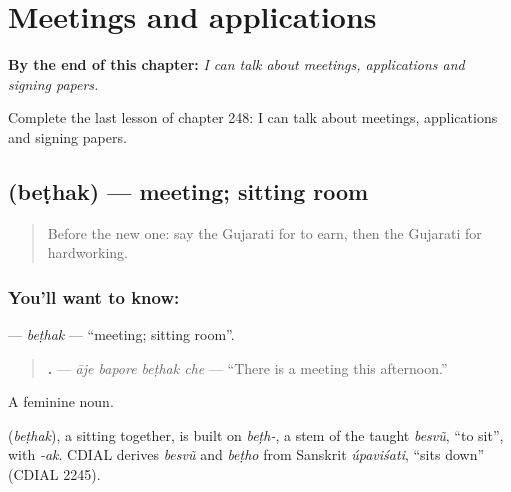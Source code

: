 
\chapter{Meetings and applications}
\label{ch:gu-meetings-and-applications}

\begin{chapteropening}
\textbf{By the end of this chapter:} \emph{I can talk about meetings, applications and signing papers.}

Complete the last lesson of chapter 248: I can talk about meetings, applications and signing papers.
\end{chapteropening}

\section[\texorpdfstring{\gu{બેઠક} (beṭhak)}{બેઠક (beṭhak)}]{ (beṭhak) — meeting; sitting room}

\label{lesson:GU-C248-bethak}



\begin{quote}
Before the new one: say the Gujarati for to earn, then the Gujarati for hardworking.
\end{quote}

\subsection*{You'll want to know: }
\textbf{} — \emph{beṭhak} — \textquotedblleft{}meeting; sitting room\textquotedblright{}.

\begin{quote}
\textbf{   .} — \emph{āje bapore beṭhak che} — \textquotedblleft{}There is a meeting this afternoon.\textquotedblright{}
\end{quote}

A feminine noun.

\begin{cousinweb}
\textbf{} (\emph{beṭhak}), a sitting together, is built on \emph{beṭh-}, a stem of the taught \emph{besvũ}, \textquotedblleft{}to sit\textquotedblright{}, with \emph{-ak}. CDIAL derives \emph{besvũ} and \emph{beṭho} from Sanskrit \emph{úpaviśati}, \textquotedblleft{}sits down\textquotedblright{} (CDIAL 2245).
\end{cousinweb}


